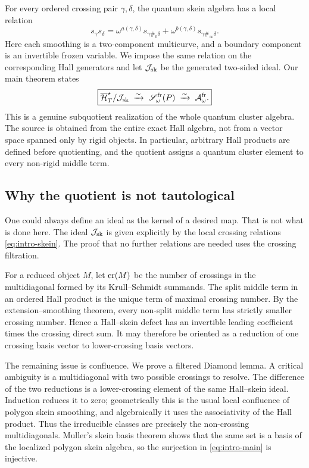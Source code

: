 For every ordered crossing pair $\gamma,\delta$, the quantum skein algebra has
a local relation
\begin{equation}
 s_\gamma s_\delta
 =\omega^{a(\gamma,\delta)}s_{\gamma\#_0\delta}
  +\omega^{b(\gamma,\delta)}s_{\gamma\#_\infty\delta}.
 \label{eq:intro-skein}
\end{equation}
Here each smoothing is a two-component multicurve, and a boundary component is
an invertible frozen variable.  We impose the same relation on the
corresponding Hall generators and let $\mathcal J_{\mathrm{sk}}$ be the generated two-sided ideal.
Our main theorem states
\begin{equation}
 \boxed{
  \overline{\mathcal H}_{T}^{\star}/\mathcal J_{\mathrm{sk}}
  \;\xrightarrow{\sim}\;
  \mathscr S_\omega^{\rm fr}(P)
  \;\xrightarrow{\sim}\;
  \mathcal A_{\omega}^{\mathrm{fr}}.
 }
 \label{eq:intro-main}
\end{equation}
This is a genuine subquotient realization of the whole quantum cluster
algebra.  The source is obtained from the entire exact Hall algebra, not from
a vector space spanned only by rigid objects.  In particular, arbitrary Hall
products are defined before quotienting, and the quotient assigns a quantum
cluster element to every non-rigid middle term.

\subsection*{Why the quotient is not tautological}

One could always define an ideal as the kernel of a desired map.  That is not
what is done here.  The ideal $\mathcal J_{\mathrm{sk}}$ is given explicitly by the local crossing
relations \eqref{eq:intro-skein}.  The proof that no further relations are
needed uses the crossing filtration.

For a reduced object $M$, let $\operatorname{cr}(M)$ be the number of crossings in the
multidiagonal formed by its Krull--Schmidt summands.  The split middle term in
an ordered Hall product is the unique term of maximal crossing number.  By the
extension--smoothing theorem, every non-split middle term has strictly smaller
crossing number.  Hence a Hall--skein defect has an invertible leading
coefficient times the crossing direct sum.  It may therefore be oriented as a
reduction of one crossing basis vector to lower-crossing basis vectors.

The remaining issue is confluence.  We prove a filtered Diamond lemma.  A
critical ambiguity is a multidiagonal with two possible crossings to resolve.
The difference of the two reductions is a lower-crossing element of the same
Hall--skein ideal.  Induction reduces it to zero; geometrically this is the
usual local confluence of polygon skein smoothing, and algebraically it uses
the associativity of the Hall product.  Thus the irreducible classes are
precisely the non-crossing multidiagonals.  Muller's skein basis theorem shows
that the same set is a basis of the localized polygon skein algebra, so the
surjection in \eqref{eq:intro-main} is injective.

